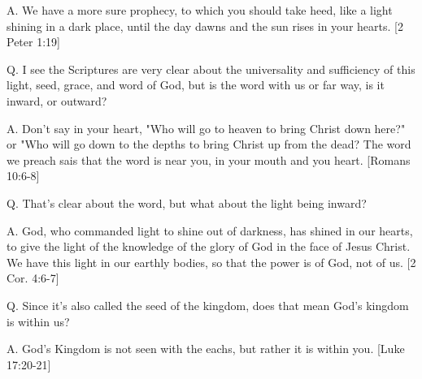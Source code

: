 \documentclass[../main.tex]{subfiles}
\begin{document}
	A. We have a more sure prophecy, to which you should take heed, like a light shining in a dark place, until the day dawns and the sun rises in your hearts. [2 Peter 1:19]

	Q. I see the Scriptures are very clear about the universality and sufficiency of this light, seed, grace, and word of God, but is the word with us or far way, is it inward, or outward?

	A. Don't say in your heart, "Who will go to heaven to bring Christ down here?" or "Who will go down to the depths to bring Christ up from the dead?  The word we preach sais that the word is near you, in your mouth and you heart. [Romans 10:6-8]

	Q. That's clear about the word, but what about the light being inward?

	A. God, who commanded light to shine out of darkness, has shined in our hearts, to give the light of the knowledge of the glory of God in the face of Jesus Christ. We have this light in our earthly bodies, so that the power is of God, not of us. [2 Cor. 4:6-7]

	Q. Since it's also called the seed of the kingdom, does that mean God's kingdom is within us?

	A. God's Kingdom is not seen with the eachs, but rather it is within you. [Luke 17:20-21]
\end{document}

